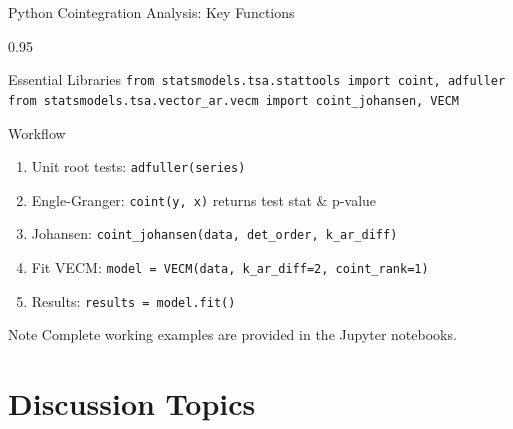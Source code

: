\documentclass[9pt, aspectratio=169, t]{beamer}
\begin{document}
\begin{frame}{Python Cointegration Analysis: Key Functions}
    \begin{cminipage}{0.95\textwidth}
    {\footnotesize
    \begin{block}{Essential Libraries}
        \texttt{from statsmodels.tsa.stattools import coint, adfuller} \\
        \texttt{from statsmodels.tsa.vector\_ar.vecm import coint\_johansen, VECM}
    \end{block}

    \begin{block}{Workflow}
        \begin{enumerate}\setlength{\itemsep}{0pt}
            \item Unit root tests: \texttt{adfuller(series)}
            \item Engle-Granger: \texttt{coint(y, x)} returns test stat \& p-value
            \item Johansen: \texttt{coint\_johansen(data, det\_order, k\_ar\_diff)}
            \item Fit VECM: \texttt{model = VECM(data, k\_ar\_diff=2, coint\_rank=1)}
            \item Results: \texttt{results = model.fit()}
        \end{enumerate}
    \end{block}

    \begin{alertblock}{Note}
        Complete working examples are provided in the Jupyter notebooks.
    \end{alertblock}
    }
    \end{cminipage}
\end{frame}

\section{Discussion Topics}
\end{document}
